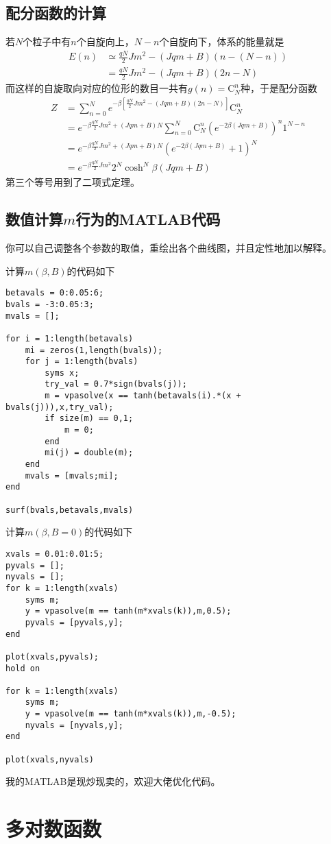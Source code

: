 \documentclass[a4paper,11pt]{ctexart}
\newcommand{\bea}{\begin{equation}\begin{aligned}}
\newcommand{\eea}{\end{aligned}\end{equation}}
\begin{document}
\subsection{配分函数的计算}
若$N$个粒子中有$n$个自旋向上，$N-n$个自旋向下，体系的能量就是
\bea
E(n) &\simeq \frac{qN}{2}Jm^2 - (Jqm+B)(n-(N-n))\\
&= \frac{qN}{2}Jm^2 - (Jqm+B)(2n-N)
\eea
而这样的自旋取向对应的位形的数目一共有$g(n) = \mathrm{C}_N^n$种，于是配分函数
\bea
Z &= \sum_{n=0}^N e^{-\beta[\frac{qN}{2}Jm^2 - (Jqm+B)(2n-N)]}\mathrm{C}_N^n\\
&= e^{-\beta \frac{qN}{2}Jm^2+(Jqm+B)N}\sum_{n=0}^N \mathrm{C}_N^n (e^{-2\beta(Jqm+B)})^n 1^{N-n} \\
&= e^{-\beta \frac{qN}{2}Jm^2+(Jqm+B)N}(e^{-2\beta(Jqm+B)}+1)^N\\
&= e^{-\beta \frac{qN}{2}Jm^2}2^N\cosh^N\beta(Jqm+B)
\eea
第三个等号用到了二项式定理。
\subsection{数值计算$m$行为的MATLAB代码}
你可以自己调整各个参数的取值，重绘出各个曲线图，并且定性地加以解释。
\par
计算$m(\beta,B)$的代码如下
\begin{verbatim}
betavals = 0:0.05:6;
bvals = -3:0.05:3;
mvals = [];

for i = 1:length(betavals)
    mi = zeros(1,length(bvals));
    for j = 1:length(bvals)
        syms x;
        try_val = 0.7*sign(bvals(j));
        m = vpasolve(x == tanh(betavals(i).*(x + bvals(j))),x,try_val);
        if size(m) == 0,1;
            m = 0;
        end
        mi(j) = double(m);
    end
    mvals = [mvals;mi];
end

surf(bvals,betavals,mvals)
\end{verbatim}
计算$m(\beta,B=0)$的代码如下
\begin{verbatim}
xvals = 0.01:0.01:5;
pyvals = [];
nyvals = [];
for k = 1:length(xvals)
    syms m;
    y = vpasolve(m == tanh(m*xvals(k)),m,0.5);
    pyvals = [pyvals,y];
end

plot(xvals,pyvals);
hold on

for k = 1:length(xvals)
    syms m;
    y = vpasolve(m == tanh(m*xvals(k)),m,-0.5);
    nyvals = [nyvals,y];
end

plot(xvals,nyvals)
\end{verbatim}
我的MATLAB是现炒现卖的，欢迎大佬优化代码。

\section{多对数函数}
\end{document}
